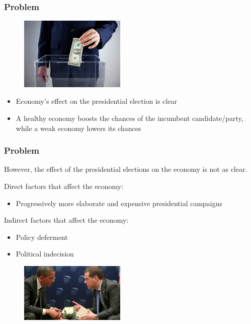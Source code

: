 \documentclass[compress,handout,10pt]{beamer}
\let\olditem\item
\renewcommand{\item}{\setlength{\itemsep}{0.5\baselineskip}\olditem}
\begin{document}
\begin{frame}
    \frametitle{Problem}
\begin{center}
    \begin{figure}
            \includegraphics[width=0.45\textwidth]{images/moneyballot.jpeg}
    \end{figure}
    \vspace{2pt}
\end{center}
\begin{itemize}
\pause \item Economy's effect on the presidential election is clear
\pause \item A healthy economy boosts the chances of the incumbent candidate/party, while a weak economy lowers its chances
\end{itemize}
\end{frame}

\begin{frame}
    \frametitle{Problem}
However, the effect of the presidential elections on the economy is not as clear.

Direct factors that affect the economy:
\begin{itemize}
\item Progressively more elaborate and expensive presidential campaigns
\end{itemize}

Indirect factors that affect the economy:
\begin{itemize}
 \item Policy deferment
 \item Political indecision
\end{itemize}

\begin{center}
    \begin{figure}
            \includegraphics[width=0.45\textwidth]{images/obamamedvedev.jpeg}
    \end{figure}
\end{center}

\end{frame}
\end{document}
